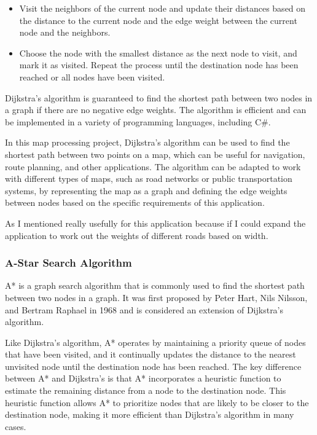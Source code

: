 \begin{FlushLeft}
\begin{itemize}
    \item Visit the neighbors of the current node and update their distances based on the distance to the current node and the edge weight between the current node and the neighbors.

    \item Choose the node with the smallest distance as the next node to visit, and mark it as visited. Repeat the process until the destination node has been reached or all nodes have been visited.
    \end{itemize}

    Dijkstra's algorithm is guaranteed to find the shortest path between two nodes in a graph if there are no negative edge weights. The algorithm is efficient and can be implemented in a variety of programming languages, including C#.\\ \bk

    In this map processing project, Dijkstra's algorithm can be used to find the shortest path between two points on a map, which can be useful for navigation, route planning, and other applications. The algorithm can be adapted to work with different types of maps, such as road networks or public transportation systems, by representing the map as a graph and defining the edge weights between nodes based on the specific requirements of this application. \\ \bk

    As I mentioned really usefully for this application because if I could expand the application to work out the weights of different roads based on width. \\ 
    \bk
    
    \subsubsection{A-Star Search Algorithm}
    A* is a graph search algorithm that is commonly used to find the shortest path between two nodes in a graph. It was first proposed by Peter Hart, Nils Nilsson, and Bertram Raphael in 1968 and is considered an extension of Dijkstra's algorithm. \\ \bk

    Like Dijkstra's algorithm, A* operates by maintaining a priority queue of nodes that have been visited, and it continually updates the distance to the nearest unvisited node until the destination node has been reached. The key difference between A* and Dijkstra's is that A* incorporates a heuristic function to estimate the remaining distance from a node to the destination node. This heuristic function allows A* to prioritize nodes that are likely to be closer to the destination node, making it more efficient than Dijkstra's algorithm in many cases. \\ \bk


\end{FlushLeft}
